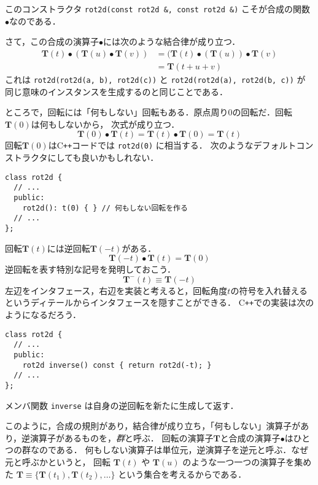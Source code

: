 \documentclass{jsbook}
\newcommand{\cxx}{\textrm{C}\texttt{++}}
\newcommand{\ccode}[1]{\texttt{#1}}
\newcommand{\keyword}[1]{\emph{#1}}
\newcommand{\bop}[1]{\boldsymbol{#1}}
\newcommand{\bg}[1]{\mathbf{#1}}
\begin{document}
このコンストラクタ \ccode{rot2d(const rot2d \&, const rot2d \&)} こそが合成の関数$\bullet$なのである．

さて，この合成の演算子$\bullet$には次のような結合律が成り立つ．
\begin{align}
\bop{T}(t)\bullet(\bop{T}(u)\bullet\bop{T}(v))&=(\bop{T}(t)\bullet(\bop{T}(u))\bullet\bop{T}(v)\\
  &=\bop{T}(t+u+v)
\end{align}
これは \ccode{rot2d(rot2d(a, b), rot2d(c))} と \ccode{rot2d(rot2d(a), rot2d(b, c))} が
同じ意味のインスタンスを生成するのと同じことである．

ところで，回転には「何もしない」回転もある．原点周り$0$の回転だ．回転$\bop{T}(0)$は何もしないから，
次式が成り立つ．
\begin{equation}
\bop{T}(0)\bullet\bop{T}(t)=\bop{T}(t)\bullet\bop{T}(0)=\bop{T}(t)
\end{equation}
回転$\bop{T}(0)$は\cxx コードでは \ccode{rot2d(0)} に相当する．
次のようなデフォルトコンストラクタにしても良いかもしれない．

\begin{verbatim}
class rot2d {
  // ...
  public:
    rot2d(): t(0) { } // 何もしない回転を作る
  // ...
};
\end{verbatim}

回転$\bop{T}(t)$には逆回転$\bop{T}(-t)$がある．
\begin{equation}
\bop{T}(-t)\bullet\bop{T}(t)=\bop{T}(0)
\end{equation}
逆回転を表す特別な記号を発明しておこう．
\begin{equation}
\bop{T}^{-}(t)\equiv\bop{T}(-t)
\end{equation}
左辺をインタフェース，右辺を実装と考えると，回転角度$t$の符号を入れ替えるというディテールからインタフェースを隠すことができる．
\cxx での実装は次のようになるだろう．

\begin{verbatim}
class rot2d {
  // ...
  public:
    rot2d inverse() const { return rot2d(-t); }
  // ...
};
\end{verbatim}

メンバ関数 \ccode{inverse} は自身の逆回転を新たに生成して返す．

このように，合成の規則があり，結合律が成り立ち，「何もしない」演算子があり，逆演算子があるものを，\keyword{群}と呼ぶ．
回転の演算子$\bop{T}$と合成の演算子$\bullet$はひとつの群なのである．
何もしない演算子は単位元，逆演算子を逆元と呼ぶ．なぜ元と呼ぶかというと，
回転 $\bop{T}(t)$ や $\bop{T}(u)$ のような一つ一つの演算子を集めた $\bg{T}\equiv\{\bop{T}(t_1),\bop{T}(t_2),\dots\}$ という集合を考えるからである．
\end{document}
